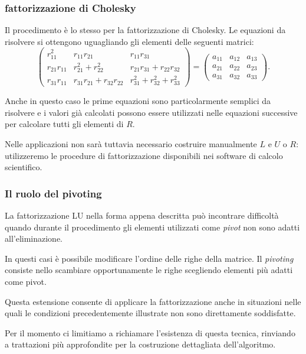 \subsubsection{fattorizzazione di Cholesky} Il procedimento è lo stesso per la fattorizzazione di Cholesky. Le equazioni da risolvere si ottengono uguagliando gli elementi delle seguenti matrici:
\[
\begin{pmatrix}
r_{11}^2 &
r_{11}r_{21} &
r_{11}r_{31}\\
r_{21}r_{11} &
r_{21}^2+r_{22}^2 &
r_{21}r_{31}+r_{22}r_{32}\\
r_{31}r_{11} &
r_{31}r_{21}+r_{32}r_{22} &
r_{31}^2+r_{32}^2+r_{33}^2
\end{pmatrix}
=
\begin{pmatrix}
a_{11} & a_{12} & a_{13}\\
a_{21} & a_{22} & a_{23}\\
a_{31} & a_{32} & a_{33}
\end{pmatrix}.
\]

Anche in questo caso le prime equazioni sono particolarmente semplici
da risolvere e i valori già calcolati possono essere utilizzati
nelle equazioni successive per calcolare tutti gli elementi di $R$.

Nelle applicazioni non sarà tuttavia necessario costruire
manualmente $L$ e $U$ o $R$: utilizzeremo le procedure di
fattorizzazione disponibili nei software di calcolo scientifico.


\subsubsection{Il ruolo del pivoting}

La fattorizzazione LU nella forma appena descritta può incontrare
difficoltà quando durante il procedimento gli elementi utilizzati
come \emph{pivot} non sono adatti all'eliminazione.

In questi casi è possibile modificare l'ordine delle righe della
matrice. Il \emph{pivoting} consiste nello scambiare opportunamente
le righe scegliendo elementi più adatti come pivot.

Questa estensione consente di applicare la fattorizzazione anche
in situazioni nelle quali le condizioni precedentemente illustrate
non sono direttamente soddisfatte.

Per il momento ci limitiamo a richiamare l'esistenza di questa
tecnica, rinviando a trattazioni più approfondite per la
costruzione dettagliata dell'algoritmo.


